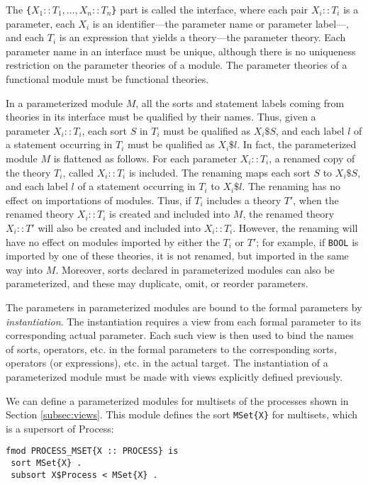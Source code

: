 The \verb"{"$X_1 :: T_1 , \ldots , X_n :: T_n$\verb"}" part is called the
interface, where each pair $X_i :: T_i$ is a parameter, each $X_i$ is an
identifier---the parameter name or parameter label---, and each $T_i$ is
an expression that yields a theory---the parameter theory. Each parameter
name in an interface must be unique, although there is no uniqueness
restriction on the parameter theories of a module. The parameter theories
of a functional module must be functional theories.

In a parameterized module $M$, all the sorts and statement labels
coming from theories in its interface must be qualified by their names. Thus,
given a parameter $X_i :: T_i$, each sort $S$ in $T_i$ must be
qualified as $X_i\texttt{\$}S$, and each label $l$ of a statement occurring in
$T_i$ must be qualified as $X_i\texttt{\$}l$. In fact, the parameterized module
$M$ is flattened as follows. For each parameter $X_i :: T_i$, 
a renamed copy of the theory $T_i$, called $X_i :: T_i$ is included.
The renaming  maps each sort $S$ to $X_i\texttt{\$}S$, and each label $l$
of a statement occurring in $T_i$ to $X_i\texttt{\$}l$. The renaming has
no effect on importations of modules. Thus, if $T_i$ includes a theory $T'$,
when the renamed
theory $X_i :: T_i$ is created and included into $M$, the renamed
theory $X_i :: T'$ will also be created and included into $X_i :: T_i$. 
However, the renaming will have no effect on modules imported by either the
$T_i$ or $T'$; for example, if \verb"BOOL" is imported by one of these
theories, it is not renamed, but imported in the same way into $M$.
%
Moreover, sorts declared in parameterized modules can also be parameterized,
and these may duplicate, omit, or reorder parameters.

The parameters in parameterized modules are bound to the formal parameters
by \emph{instantiation}. The 
instantiation requires a view from each formal parameter to its corresponding 
actual parameter. Each such view is then used to bind the names of sorts, 
operators, etc. in the formal parameters to the corresponding sorts, operators 
(or expressions), etc. in the actual target.
The instantiation of a parameterized module must be made with views 
explicitly defined previously.

We can define a parameterized modules for multisets of the processes shown in
Section \ref{subsec:views}. This module defines the sort \verb"MSet{X}" for
multisets, which is a supersort of Process:

{\codesize
\begin{verbatim}
fmod PROCESS_MSET{X :: PROCESS} is
 sort MSet{X} .
 subsort X$Process < MSet{X} .
\end{verbatim}
}

